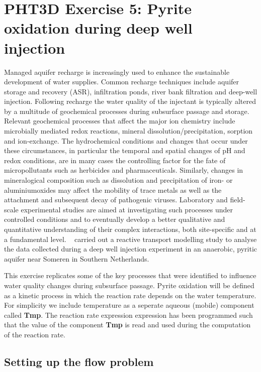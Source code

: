 \newpage
\section[PHT3D Exercise 5: Pyrite oxidation during deep well injection]{PHT3D Exercise 5: Pyrite oxidation during deep well injection}

Managed aquifer recharge is increasingly used to enhance the sustainable development of water supplies. Common recharge techniques include aquifer storage and recovery (ASR), infiltration ponds, river bank filtration and deep-well injection. Following recharge the water quality of the injectant is typically altered by a multitude of geochemical processes during subsurface passage and storage. Relevant geochemical processes that affect the major ion chemistry include microbially mediated redox reactions, mineral dissolution/precipitation, sorption and ion-exchange. The hydrochemical conditions and changes that occur under these circumstances, in particular the temporal and spatial changes of pH and redox conditions, are in many cases the controlling factor for the fate of micropollutants such as herbicides and pharmaceuticals. Similarly, changes in mineralogical composition such as dissolution and precipitation of iron- or aluminiumoxides may affect the mobility of trace metals as well as the attachment and subsequent decay of pathogenic viruses. Laboratory and field-scale experimental studies are aimed at investigating such processes under controlled conditions and to eventually develop a better qualitative and quantitative understanding of their complex interactions, both site-specific and at a fundamental level. \
\cite{prommer_stuyfzand_2005} carried out a reactive transport 
modelling study to analyse the data collected during a deep well 
injection experiment in an anaerobic, pyritic aquifer near Someren in Southern Netherlands. 

This exercise replicates some of the key processes that were identified
to influence water quality changes during subsurface passage. 
Pyrite oxidation will be defined as a kinetic process in which the
reaction rate depends on the water temperature. 
For simplicity we include temperature as a seperate aqueous (mobile) component
called {\color{red} \textbf{Tmp}}.
The reaction rate expression expression has been programmed such 
that the value of the component {\color{red} \textbf{Tmp}} is read
and used during the computation of the reaction rate. 

\subsection[Setting up the flow problem]{Setting up the flow problem}

